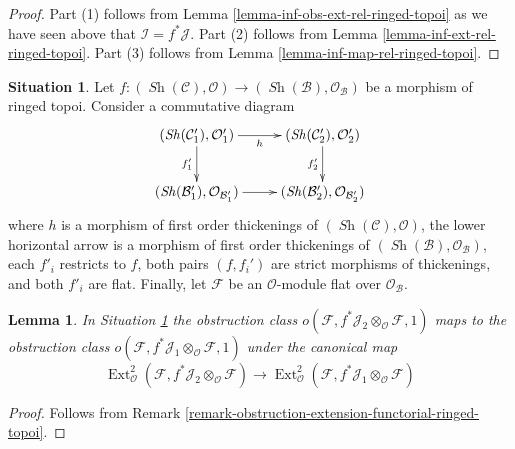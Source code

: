\documentclass{stacks-project}
\theoremstyle{plain}
\newtheorem{lemma}[subsection]{Lemma}
\theoremstyle{definition}
\newtheorem{situation}[subsection]{Situation}
\theoremstyle{remark}
\numberwithin{equation}{subsection}
\def\Ext{\mathop{\mathrm{Ext}}\nolimits}
\def\Sh{\mathop{\mathit{Sh}}\nolimits}
\begin{document}
\begin{proof}
Part (1) follows from Lemma \ref{lemma-inf-obs-ext-rel-ringed-topoi}
as we have seen above that $\mathcal{I} = f^*\mathcal{J}$.
Part (2) follows from Lemma \ref{lemma-inf-ext-rel-ringed-topoi}.
Part (3) follows from Lemma \ref{lemma-inf-map-rel-ringed-topoi}.
\end{proof}

\begin{situation}
\label{situation-morphism-flat-thickenings-ringed-topoi}
Let $f : (\Sh(\mathcal{C}), \mathcal{O}) \to
(\Sh(\mathcal{B}), \mathcal{O}_\mathcal{B})$ be a morphism of
ringed topoi. Consider a commutative diagram
$$
\xymatrix{
(\Sh(\mathcal{C}'_1), \mathcal{O}'_1) \ar[r]_h \ar[d]_{f'_1} &
(\Sh(\mathcal{C}'_2), \mathcal{O}'_2) \ar[d]_{f'_2} \\
(\Sh(\mathcal{B}'_1), \mathcal{O}_{\mathcal{B}'_1}) \ar[r] &
(\Sh(\mathcal{B}'_2), \mathcal{O}_{\mathcal{B}'_2})
}
$$
where $h$ is a morphism of first order thickenings
of $(\Sh(\mathcal{C}), \mathcal{O})$, the lower horizontal arrow
is a morphism of first order thickenings of
$(\Sh(\mathcal{B}), \mathcal{O}_\mathcal{B})$, each $f'_i$ restricts
to $f$, both pairs $(f, f_i')$ are strict morphisms of thickenings, and
both $f'_i$ are flat. Finally, let $\mathcal{F}$ be an
$\mathcal{O}$-module flat over $\mathcal{O}_\mathcal{B}$.
\end{situation}

\begin{lemma}
\label{lemma-functorial-ringed-topoi}
In Situation \ref{situation-morphism-flat-thickenings-ringed-topoi}
the obstruction class
$o(\mathcal{F}, f^*\mathcal{J}_2 \otimes_\mathcal{O} \mathcal{F}, 1)$
maps to the obstruction class
$o(\mathcal{F}, f^*\mathcal{J}_1 \otimes_\mathcal{O} \mathcal{F}, 1)$
under the canonical map
$$
\Ext^2_\mathcal{O}(
\mathcal{F}, f^*\mathcal{J}_2 \otimes_\mathcal{O} \mathcal{F})
\to \Ext^2_\mathcal{O}(
\mathcal{F}, f^*\mathcal{J}_1 \otimes_\mathcal{O} \mathcal{F})
$$
\end{lemma}

\begin{proof}
Follows from Remark \ref{remark-obstruction-extension-functorial-ringed-topoi}.
\end{proof}
\end{document}
